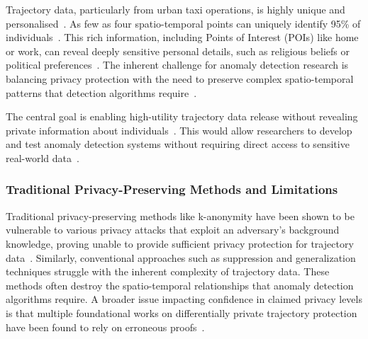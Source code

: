 \documentclass[runningheads]{llncs}
\begin{document}
Trajectory data, particularly from urban taxi operations, is highly unique and personalised~\cite{primaultLongRoadComputational2019,buchholzReconstructionAttackDifferential2022,maTrajectoryPrivacyProtection2021}. As few as four spatio-temporal points can uniquely identify 95\% of individuals~\cite{primaultLongRoadComputational2019,buchholzReconstructionAttackDifferential2022,maTrajectoryPrivacyProtection2021}. This rich information, including Points of Interest (POIs) like home or work, can reveal deeply sensitive personal details, such as religious beliefs or political preferences~\cite{primaultLongRoadComputational2019,buchholzReconstructionAttackDifferential2022}. The inherent challenge for anomaly detection research is balancing privacy protection with the need to preserve complex spatio-temporal patterns that detection algorithms require~\cite{buchholzSystematisationKnowledgeTrajectory2024,buchholzReconstructionAttackDifferential2022,primaultLongRoadComputational2019,naghizadePrivacyContextawareRelease2020}.

The central goal is enabling high-utility trajectory data release without revealing private information about individuals~\cite{buchholzSystematisationKnowledgeTrajectory2024,raoLSTMTrajGANDeepLearning2020a,liuTrajGANsUsingGenerative2018,jinSurveyExperimentalStudy2023,maTrajectoryPrivacyProtection2021,naghizadePrivacyContextawareRelease2020}. This would allow researchers to develop and test anomaly detection systems without requiring direct access to sensitive real-world data~\cite{buchholzSystematisationKnowledgeTrajectory2024,raoLSTMTrajGANDeepLearning2020a,liuTrajGANsUsingGenerative2018}.

\subsubsection{Traditional Privacy-Preserving Methods and Limitations}

Traditional privacy-preserving methods like k-anonymity have been shown to be vulnerable to various privacy attacks that exploit an adversary's background knowledge, proving unable to provide sufficient privacy protection for trajectory data~\cite{chenDifferentiallyPrivateTrajectory2011,buchholzReconstructionAttackDifferential2022,jinSurveyExperimentalStudy2023}. Similarly, conventional approaches such as suppression and generalization techniques struggle with the inherent complexity of trajectory data. These methods often destroy the spatio-temporal relationships that anomaly detection algorithms require. A broader issue impacting confidence in claimed privacy levels is that multiple foundational works on differentially private trajectory protection have been found to rely on erroneous proofs~\cite{buchholzSystematisationKnowledgeTrajectory2024,primaultDifferentiallyPrivateLocation2014,erroundaAnalysisDifferentialPrivacy2019}.
\end{document}
